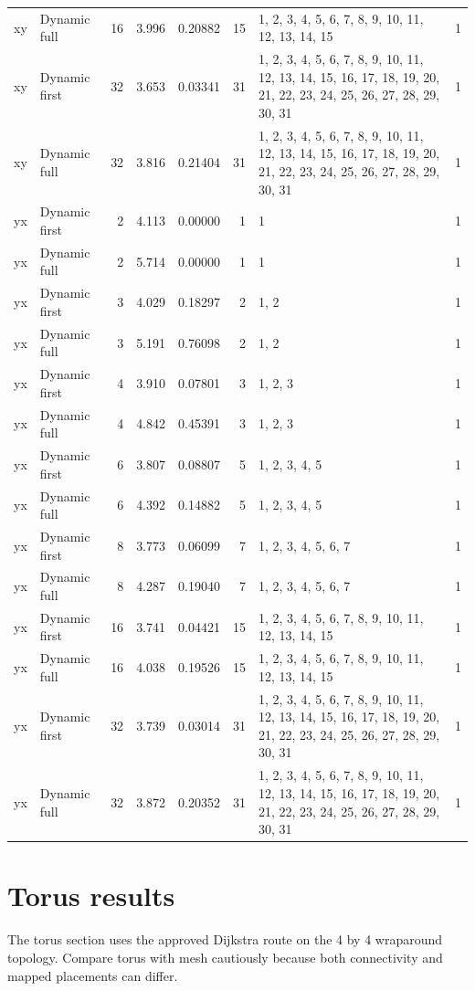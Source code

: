 \documentclass[10pt,a4paper]{article}
\begin{document}
\begin{longtable}{@{}p{23mm}p{29mm}rrrrp{36mm}r@{}}
xy & Dynamic full & 16 & 3.996 & 0.20882 & 15 & 1, 2, 3, 4, 5, 6, 7, 8, 9, 10, 11, 12, 13, 14, 15 & 1 \\
xy & Dynamic first & 32 & 3.653 & 0.03341 & 31 & 1, 2, 3, 4, 5, 6, 7, 8, 9, 10, 11, 12, 13, 14, 15, 16, 17, 18, 19, 20, 21, 22, 23, 24, 25, 26, 27, 28, 29, 30, 31 & 1 \\
xy & Dynamic full & 32 & 3.816 & 0.21404 & 31 & 1, 2, 3, 4, 5, 6, 7, 8, 9, 10, 11, 12, 13, 14, 15, 16, 17, 18, 19, 20, 21, 22, 23, 24, 25, 26, 27, 28, 29, 30, 31 & 1 \\
yx & Dynamic first & 2 & 4.113 & 0.00000 & 1 & 1 & 1 \\
yx & Dynamic full & 2 & 5.714 & 0.00000 & 1 & 1 & 1 \\
yx & Dynamic first & 3 & 4.029 & 0.18297 & 2 & 1, 2 & 1 \\
yx & Dynamic full & 3 & 5.191 & 0.76098 & 2 & 1, 2 & 1 \\
yx & Dynamic first & 4 & 3.910 & 0.07801 & 3 & 1, 2, 3 & 1 \\
yx & Dynamic full & 4 & 4.842 & 0.45391 & 3 & 1, 2, 3 & 1 \\
yx & Dynamic first & 6 & 3.807 & 0.08807 & 5 & 1, 2, 3, 4, 5 & 1 \\
yx & Dynamic full & 6 & 4.392 & 0.14882 & 5 & 1, 2, 3, 4, 5 & 1 \\
yx & Dynamic first & 8 & 3.773 & 0.06099 & 7 & 1, 2, 3, 4, 5, 6, 7 & 1 \\
yx & Dynamic full & 8 & 4.287 & 0.19040 & 7 & 1, 2, 3, 4, 5, 6, 7 & 1 \\
yx & Dynamic first & 16 & 3.741 & 0.04421 & 15 & 1, 2, 3, 4, 5, 6, 7, 8, 9, 10, 11, 12, 13, 14, 15 & 1 \\
yx & Dynamic full & 16 & 4.038 & 0.19526 & 15 & 1, 2, 3, 4, 5, 6, 7, 8, 9, 10, 11, 12, 13, 14, 15 & 1 \\
yx & Dynamic first & 32 & 3.739 & 0.03014 & 31 & 1, 2, 3, 4, 5, 6, 7, 8, 9, 10, 11, 12, 13, 14, 15, 16, 17, 18, 19, 20, 21, 22, 23, 24, 25, 26, 27, 28, 29, 30, 31 & 1 \\
yx & Dynamic full & 32 & 3.872 & 0.20352 & 31 & 1, 2, 3, 4, 5, 6, 7, 8, 9, 10, 11, 12, 13, 14, 15, 16, 17, 18, 19, 20, 21, 22, 23, 24, 25, 26, 27, 28, 29, 30, 31 & 1 \\
\end{longtable}\normalsize\setlength{\tabcolsep}{6pt}
\clearpage
\part*{Torus results}
The torus section uses the approved Dijkstra route on the 4 by 4 wraparound topology. Compare torus with mesh cautiously because both connectivity and mapped placements can differ.
\clearpage
\end{document}
